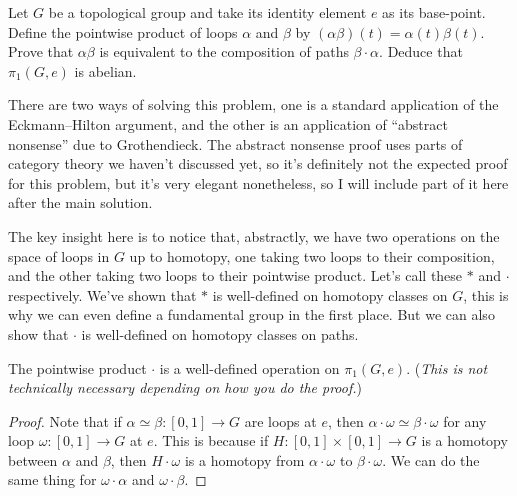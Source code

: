 \begin{problem}{1.3}
    Let $G$ be a topological group and take its identity element $e$ as its base-point. Define the pointwise product of loops $\alpha$ and $\beta$ by $(\alpha\beta)(t)=\alpha(t)\beta(t)$. Prove that $\alpha\beta$ is equivalent to the composition of paths $\beta\cdot \alpha$. Deduce that $\pi_1(G,e)$ is abelian.
\end{problem}

\begin{solution}
    There are two ways of solving this problem, one is a standard application of the Eckmann–Hilton argument, and the other is an application of ``abstract nonsense'' due to Grothendieck. The abstract nonsense proof uses parts of category theory we haven't discussed yet, so it's definitely not the expected proof for this problem, but it's very elegant nonetheless, so I will include part of it here after the main solution.

    The key insight here is to notice that, abstractly, we have two operations on the space of loops in $G$ up to homotopy, one taking two loops to their composition, and the other taking two loops to their pointwise product. Let's call these $*$ and $\cdot$ respectively. 
    We've shown that $*$ is well-defined on homotopy classes on $G$, this is why we can even define a fundamental group in the first place. But we can also show that $\cdot$ is well-defined on homotopy classes on paths.

    \begin{claim}
        The pointwise product $\cdot$ is a well-defined operation on $\pi_1(G, e)$. (\emph{This is not technically necessary depending on how you do the proof.})
    \end{claim}

    \begin{proof}
        Note that if $\alpha \simeq \beta : [0,1] \to G$ are loops at $e$, then $\alpha\cdot \omega \simeq \beta\cdot \omega$ for any loop $\omega : [0,1] \to G$ at $e$. This is because if $H: [0,1]\times [0,1] \to G$ is a homotopy between $\alpha$ and $\beta$, then $H\cdot \omega$ is a homotopy from $\alpha\cdot \omega$ to $\beta\cdot \omega$. We can do the same thing for $\omega\cdot \alpha$ and $\omega\cdot \beta$.
    \end{proof}


\end{solution}

